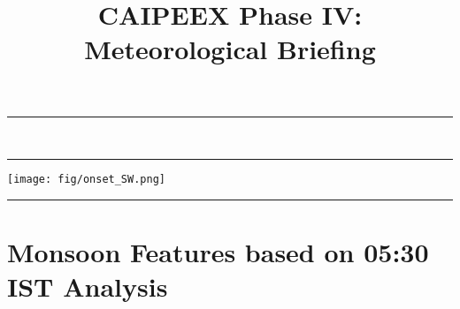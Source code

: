\documentclass[12pt,a4paper]{article} %
\title{CAIPEEX Phase IV: Meteorological Briefing}%
\newcommand{\HorRule}[1]{\noindent\rule{\linewidth}{#1}} %
\newcommand{\SepRule}{\noindent	%
\begin{center}
\rule{250pt}{1pt} %
\end{center}
}
\begin{document}
\maketitle

\noindent\HorRule{3pt} \\[-0.75\baselineskip] %
\HorRule{1pt} %




%


\begin{multicols}{3} %
\texttt{[image: fig/onset\_SW.png]}
\SepRule %
\vspace{0.3cm}




\vfill
\section{Monsoon Features based on 05:30 IST Analysis}

\begin{itemize}

\end{itemize}
\end{multicols}
\end{document}
